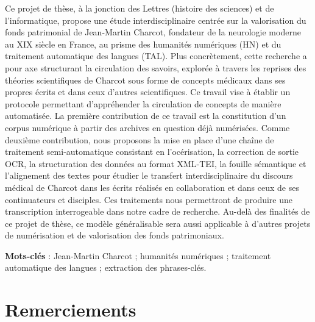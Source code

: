 

Ce projet de thèse, à la jonction des Lettres (histoire des sciences) et de l'informatique, propose une étude interdisciplinaire centrée sur la valorisation du fonds patrimonial de Jean-Martin Charcot, fondateur de la neurologie moderne au XIX\ieme{} siècle en France, au prisme des humanités numériques (\textsc{HN}) et du traitement automatique des langues (\textsc{TAL}). Plus concrètement, cette recherche a pour axe structurant la circulation des savoirs, explorée à travers les reprises des théories scientifiques de Charcot sous forme de concepts médicaux dans ses propres écrits et dans ceux d'autres scientifiques. Ce travail vise à établir un protocole permettant d'appréhender la circulation de concepts de manière automatisée. La première contribution de ce travail est la constitution d'un corpus numérique à partir des archives en question déjà numérisées. Comme deuxième contribution, nous proposons la mise en place d'une chaîne de traitement semi-automatique consistant en l'océrisation, la correction de sortie OCR, la structuration des données au format XML-TEI, la fouille sémantique et l'alignement des textes pour étudier le transfert interdisciplinaire du discours médical de Charcot dans les écrits réalisés en collaboration et dans ceux de ses continuateurs et disciples. Ces traitements nous permettront de produire une transcription interrogeable dans notre cadre de recherche. Au-delà des finalités de ce projet de thèse, ce modèle généralisable sera aussi applicable à d'autres projets de numérisation et de valorisation des fonds patrimoniaux.

\textbf{Mots-clés} : Jean-Martin Charcot ; humanités numériques ; traitement automatique des langues ; extraction des phrases-clés.


%
\cleardoublepage
\pagestyle{empty} %
\chapter*{Remerciements}

